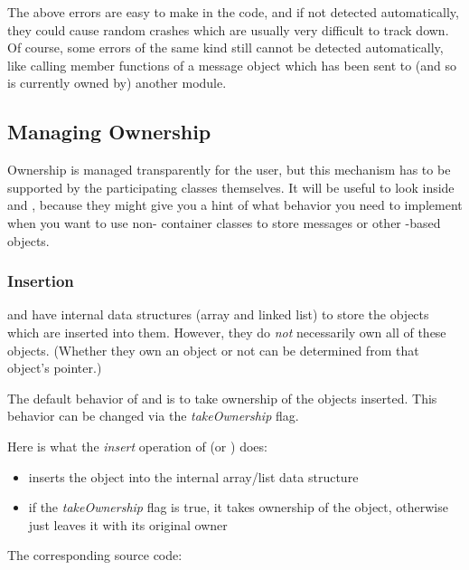 The above errors are easy to make in the code, and if not detected
automatically, they could cause random crashes which are usually very
difficult to track down. Of course, some errors of the same kind still
cannot be detected automatically, like calling member functions of a
message object which has been sent to (and so is currently owned by) another
module.


\subsection{Managing Ownership}
\label{sec:sim-lib:managing-ownership}

Ownership is managed transparently for the user, but this mechanism
has to be supported by the participating classes themselves.
It will be useful to look inside  and ,
because they might give you a hint of what behavior you need
to implement when you want to use non-{\opp} container classes
to store messages or other -based objects.


\subsubsection{Insertion}
\label{sec:sim-lib:ownership-and-insertion-into-container}

 and  have internal data structures
(array and linked list) to store the objects which are inserted
into them. However, they do \textit{not} necessarily own all of these
objects. (Whether they own an object or not can be determined
from that object's  pointer.)

The default behavior of  and  is
to take ownership of the objects inserted.
This behavior can be changed via the \textit{takeOwnership} flag.

Here is what the \textit{insert} operation of  (or ) does:
\begin{itemize}
    \item inserts the object into the internal array/list data structure

    \item if the \textit{takeOwnership} flag is true, it takes ownership
    of the object, otherwise just leaves it with its original owner
\end{itemize}

The corresponding source code:

